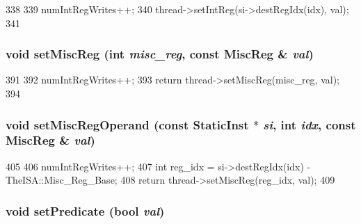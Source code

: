 \begin{DoxyCode}
338     {
339         numIntRegWrites++;
340         thread->setIntReg(si->destRegIdx(idx), val);
341     }
\end{DoxyCode}
\hypertarget{classBaseSimpleCPU_a1877dde4f3eb17a8b7d33ea40176c148}{
\subsubsection[{setMiscReg}]{\setlength{\rightskip}{0pt plus 5cm}void setMiscReg (int {\em misc\_\-reg}, \/  const {\bf MiscReg} \& {\em val})}}
\label{classBaseSimpleCPU_a1877dde4f3eb17a8b7d33ea40176c148}



\begin{DoxyCode}
391     {
392         numIntRegWrites++;
393         return thread->setMiscReg(misc_reg, val);
394     }
\end{DoxyCode}
\hypertarget{classBaseSimpleCPU_a6cfad8f780bab7feb893941cb0d46160}{
\subsubsection[{setMiscRegOperand}]{\setlength{\rightskip}{0pt plus 5cm}void setMiscRegOperand (const {\bf StaticInst} $\ast$ {\em si}, \/  int {\em idx}, \/  const {\bf MiscReg} \& {\em val})}}
\label{classBaseSimpleCPU_a6cfad8f780bab7feb893941cb0d46160}



\begin{DoxyCode}
405     {
406         numIntRegWrites++;
407         int reg_idx = si->destRegIdx(idx) - TheISA::Misc_Reg_Base;
408         return thread->setMiscReg(reg_idx, val);
409     }
\end{DoxyCode}
\hypertarget{classBaseSimpleCPU_a137a8c6cced89c2ff8387900439436b4}{
\subsubsection[{setPredicate}]{\setlength{\rightskip}{0pt plus 5cm}void setPredicate (bool {\em val})}}
\label{classBaseSimpleCPU_a137a8c6cced89c2ff8387900439436b4}



